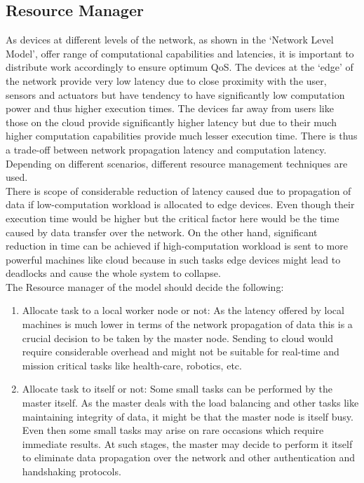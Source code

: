 \documentclass[10pt,journal,compsoc]{IEEEtran}
\begin{document}
\subsection{Resource Manager}
As devices at different levels of the network, as shown in the ‘Network Level Model’, offer range of computational capabilities and latencies, it is important to distribute work accordingly to ensure optimum QoS. The devices at the ‘edge’ of the network provide very low latency due to close proximity with the user, sensors and actuators but have tendency to have significantly low computation power and thus higher execution times. The devices far away from users like those on the cloud provide significantly higher latency but due to their much higher computation capabilities provide much lesser execution time. There is thus a trade-off between network propagation latency and computation latency. Depending on different scenarios, different resource management techniques are used.\\
There is scope of considerable reduction of latency caused due to propagation of data if low-computation workload is allocated to edge devices. Even though their execution time would be higher but the critical factor here would be the time caused by data transfer over the network. On the other hand, significant reduction in time can be achieved if high-computation workload is sent to more powerful machines like cloud because in such tasks edge devices might lead to deadlocks and cause the whole system to collapse. \\
The Resource manager of the model should decide the following:
\begin{enumerate}
\item Allocate task to a local worker node or not: As the latency offered by local machines is much lower in terms of the network propagation of data this is a crucial decision to be taken by the master node. Sending to cloud would require considerable overhead and might not be suitable for real-time and mission critical tasks like health-care, robotics, etc. 
\item Allocate task to itself or not: Some small tasks can be performed by the master itself. As the master deals with the load balancing and other tasks like maintaining integrity of data, it might be that the master node is itself busy. Even then some small tasks may arise on rare occasions which require immediate results. At such stages, the master may decide to perform it itself to eliminate data propagation over the network and other authentication and handshaking protocols.
\end{enumerate}
\end{document}
